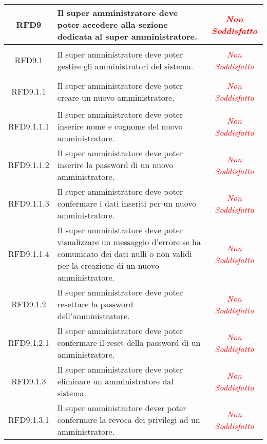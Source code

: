 \begin{longtable}{|c|>{\centering}m{7cm}|c|}
\hypertarget{RFD9}{RFD9} & Il super amministratore deve poter accedere alla sezione dedicata al super amministratore. & \textcolor{red}{\textit{Non Soddisfatto}}\\ \hline

\hypertarget{RFD9.1}{RFD9.1} & Il super amministratore deve poter gestire gli amministratori del sistema. & \textcolor{red}{\textit{Non Soddisfatto}}\\ \hline

\hypertarget{RFD9.1.1}{RFD9.1.1} & Il super amministratore deve poter creare un nuovo amministratore. & \textcolor{red}{\textit{Non Soddisfatto}}\\ \hline

\hypertarget{RFD9.1.1.1}{RFD9.1.1.1} & Il super amministratore deve poter inserire nome e cognome del nuovo amministratore. & \textcolor{red}{\textit{Non Soddisfatto}}\\ \hline

\hypertarget{RFD9.1.1.2}{RFD9.1.1.2} & Il super amministratore deve poter inserire la password di un nuovo amministratore. & \textcolor{red}{\textit{Non Soddisfatto}}\\ \hline

\hypertarget{RFD9.1.1.3}{RFD9.1.1.3} & Il super amministratore deve poter confermare i dati inseriti per un nuovo amministratore. & \textcolor{red}{\textit{Non Soddisfatto}}\\ \hline

\hypertarget{RFD9.1.1.4}{RFD9.1.1.4} & Il super amministratore deve poter visualizzare un messaggio d'errore se ha comunicato dei dati nulli o non validi per la creazione di un nuovo amministratore. & \textcolor{red}{\textit{Non Soddisfatto}}\\ \hline

\hypertarget{RFD9.1.2}{RFD9.1.2} & Il super amministratore deve poter resettare la password dell'amministratore. & \textcolor{red}{\textit{Non Soddisfatto}}\\ \hline

\hypertarget{RFD9.1.2.1}{RFD9.1.2.1} & Il super amministratore deve poter confermare il reset della password di un amministratore. & \textcolor{red}{\textit{Non Soddisfatto}}\\ \hline

\hypertarget{RFD9.1.3}{RFD9.1.3} & Il super amministratore deve poter eliminare un amministratore dal sistema. & \textcolor{red}{\textit{Non Soddisfatto}}\\ \hline

\hypertarget{RFD9.1.3.1}{RFD9.1.3.1} & Il super amministratore dever poter confermare la revoca dei privilegi ad un amministratore. & \textcolor{red}{\textit{Non Soddisfatto}}\\ \hline


\end{longtable}
